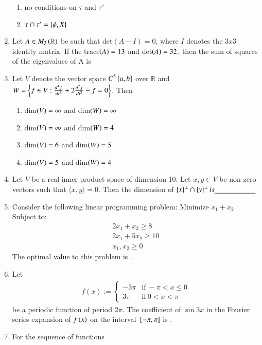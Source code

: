 \documentclass[journal]{IEEEtran}
\begin{document}
\begin{enumerate}
\begin{enumerate}
      \item no conditions on $\tau$ and $\tau'$
      \item $\tau \cap \tau' = \left\{\phi, X\right\}$
  \end{enumerate}
  \item Let $A \in M_3\left(\mathbb{R}\right)$ be such that det$(A-I) = 0$, where $I$ denotes the $3 x 3$ identity matrix. If the trace$\left(A\right) = 13$ and det$\left(A\right) = 32$, then the sum of squares of the eigenvalues of A is \underline{\hspace{2cm}} 
  \item Let $V$ denote the vector space $C^5{}\left[a, b\right]$ over $\mathbb{R}$ and $W = \left\{ f \in V : \frac{d^4 f}{dt^4} + 2 \frac{d^2 f}{dt^2} - f = 0\right\}$. Then
  \begin{enumerate}
    \item dim$\left(V\right) = \infty$ and dim$\left(W\right) = \infty$
    \item dim$\left(V\right) = \infty$ and dim$\left(W\right) = 4$
    \item dim$\left(V\right) = 6$ and dim$\left(W\right) = 5$
    \item dim$\left(V\right) = 5$ and dim$\left(W\right) = 4$
\end{enumerate}
\item Let $V$ be a real inner product space of dimension 10. Let $x, y \in V$ be non-zero vectors such that $\langle x, y \rangle = 0$. Then the dimension of $\left\{x\right\}^\perp \cap \left\{y\right\}^\perp is \underline{\hspace{2cm}}$
\item Consider the following linear programming problem: Minimize $x_1 + x_2$ Subject to:
\begin{align}
2x_1 + x_2 \geq 8 \\ 2x_1 + 5x_2 \geq 10 \\ x_1, x_2 \geq 0
\end{align}
The optimal value to this problem is \underline{\hspace{2cm}}.
\item Let \begin{align} 
f(x) :=\begin{cases}
-3\pi & \text{if} \ -\pi < x \leq 0 \\
3\pi & \text{if} \ 0 < x < \pi
\end{cases} 
\end{align} 
be a periodic function of period $2\pi$. The coefficient of $\sin 3x$ in the Fourier series expansion of $f\left(x\right)$ on the interval ${}\left[-\pi, \pi\right]$ is \underline{\hspace{2cm}}. \item For the sequence of functions 

\end{enumerate}
\end{document}
